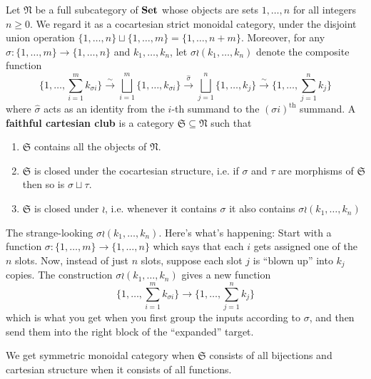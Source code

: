 \documentclass[acmsmall,screen, nonacm, anonymous]{acmart}
\begin{document}
\begin{definition}
  Let $\mathfrak{N}$ be a full subcategory of $\mathbf{Set}$ whose objects are sets ${1, \ldots, n}$ for all integers $n \geq 0$.
  We regard it as a cocartesian strict monoidal category, under the disjoint union operation $\{1, \ldots, n\} \sqcup \{1,\ldots,m\} = \{1, \ldots, n + m\}$.
  Moreover, for any $\sigma : \{1, \ldots, m\} \to \{1, \ldots, n\}$ and $k_1, \ldots, k_n$, let $\sigma \wr (k_1, \ldots, k_n)$ denote the composite function
  \[
  \{1, \ldots, \sum_{i=1}^{m}k_{\sigma i}\} \xrightarrow{\sim} \bigsqcup_{i=1}^{m}\{1, \ldots, k_{\sigma i}\} \xrightarrow{\hat{\sigma}} \bigsqcup_{j=1}^{n}\{1, \ldots, k_j\} \xrightarrow{\sim} \{1, \ldots, \sum_{j=1}^{n} k_j\}
  \]
  where $\hat{\sigma}$ acts as an identity from the $i$-th summand to the $(\sigma i)^{\text{th}}$ summand.
  A \textbf{faithful cartesian club} is a category $\mathfrak{S} \subseteq \mathfrak{N}$ such that 
  \begin{enumerate}
    \item $\mathfrak{S}$ contains all the objects of $\mathfrak{N}$.
    \item $\mathfrak{S}$ is closed under the cocartesian structure, i.e. if $\sigma$ and $\tau$ are morphisms of $\mathfrak{S}$ then so is $\sigma \sqcup \tau$.
    \item $\mathfrak{S}$ is closed under $\wr$, i.e. whenever it contains $\sigma$ it also contains $\sigma \wr (k_1, \ldots, k_n)$
  \end{enumerate}
\end{definition}

The strange-looking $\sigma \wr (k_1, \ldots, k_n)$. 
Here's what's happening: Start with a function $\sigma : \{1, \ldots, m\} \to \{1, \ldots, n\}$ which says that each $i$ gets assigned one of the $n$ slots.
Now, instead of just $n$ slots, suppose each slot $j$ is \enquote{blown up} into $k_j$ copies.
The construction $\sigma \wr (k_1, \ldots, k_n)$ gives a new function
\[
\{1, \ldots, \sum_{i=1}^{m}k_{\sigma i}\} \to \{1, \ldots, \sum_{j=1}^{n}k_j\}
\]
which is what you get when you first group the inputs according to $\sigma$, and then send them into the right block of the \enquote{expanded} target.


We get symmetric monoidal category when $\mathfrak{S}$ consists of all bijections and cartesian structure when it consists of all functions.
\end{document}
